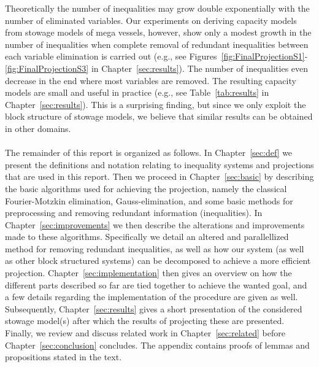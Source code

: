 Theoretically the number of inequalities may grow double exponentially with the number of eliminated variables. Our experiments on deriving capacity models from stowage models of mega vessels, however, show only a modest growth in the number of inequalities  when complete removal of redundant inequalities between each variable elimination is carried out (e.g., see Figures~\ref{fig:FinalProjectionS1}-\ref{fig:FinalProjectionS3} in Chapter~\ref{sec:results}). The number of inequalities even decrease in the end where most variables are removed. The resulting capacity models are small and useful in practice (e.g., see Table~\ref{tab:results} in Chapter~\ref{sec:results}). This is a surprising finding, but since we only exploit the block structure of stowage models, we believe that similar results can be obtained in other domains.
\\
\\
The remainder of this report is organized as follows.
In Chapter~\ref{sec:def} we present the definitions and notation relating to inequality systems and projections that are used in this report. 
Then we proceed in Chapter~\ref{sec:basic} by describing the basic algorithms used for achieving the projection, namely the classical Fourier-Motzkin elimination, Gauss-elimination, and some basic methods for preprocessing and removing redundant information (inequalities). 
In Chapter~\ref{sec:improvements} we then describe the alterations and improvements made to these algorithms. Specifically we detail an altered and parallellized method for removing redundant inequalities, as well as how our system (as well as other block structured systems) can be decomposed to achieve a more efficient projection.    
Chapter~\ref{sec:implementation} then gives an overview on how the different parts described so far are tied together to achieve the wanted goal, and a few details regarding the implementation of the procedure are given as well.
Subsequently, Chapter~\ref{sec:results} gives a short presentation of the considered stowage model(s) after which the results of projecting these are presented. 
Finally, we review and discuss related work in Chapter~\ref{sec:related} before Chapter~\ref{sec:conclusion} concludes.
{The appendix contains proofs of lemmas and propositions stated in the text.}